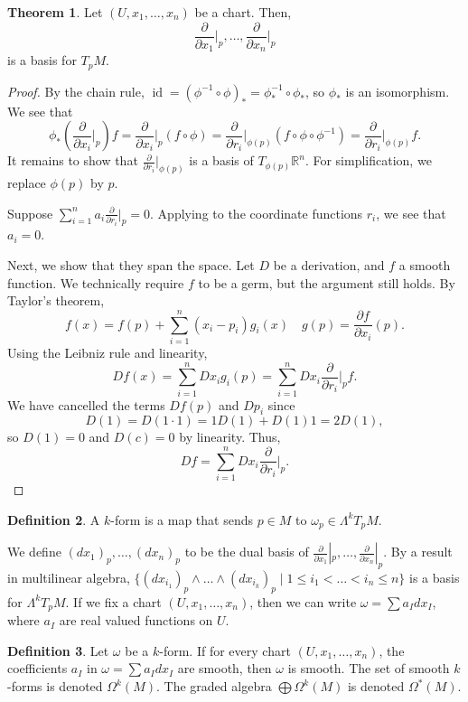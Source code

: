 \documentclass[]{article}
\DeclareMathOperator{\id}{id}
\theoremstyle{definition}
\newtheorem{theorem}{Theorem}[section] %
\theoremstyle{definition}
\newtheorem{definition}[theorem]{Definition} %
\begin{document}
\begin{theorem}
    Let $(U, x_1, \dots, x_n)$ be a chart. Then, \[\frac{\partial}{\partial x_1}\bigg|_p, \dots, \frac{\partial}{\partial x_n}\bigg|_p\] is a basis for $T_pM$.
\end{theorem}
\begin{proof}
    By the chain rule, $\id=(\phi^{-1}\circ\phi)_*=\phi^{-1}_*\circ \phi_*$, so $\phi_*$ is an isomorphism. We see that \[\phi_*\left(\frac{\partial}{\partial x_i}\bigg|_p\right)f=\frac{\partial}{\partial x_i}\bigg|_p(f\circ\phi)=\frac{\partial}{\partial r_i}\bigg|_{\phi(p)}(f\circ\phi\circ\phi^{-1})=\frac{\partial}{\partial r_i}|_{\phi(p)}f.\] It remains to show that $\frac{\partial}{\partial r_i}|_{\phi(p)}$ is a basis of $T_{\phi(p)}\mathbb{R}^n$. For simplification, we replace $\phi(p)$ by $p$.

    Suppose $\sum_{i=1}^{n}a_i\frac{\partial}{\partial r_i}|_{p}=0$. Applying to the coordinate functions $r_i$, we see that $a_i=0$.

    Next, we show that they span the space. Let $D$ be a derivation, and $f$ a smooth function. We technically require $f$ to be a germ, but the argument still holds. By Taylor's theorem, \[f(x)=f(p)+\sum_{i=1}^{n}(x_i-p_i)g_i(x)\quad g(p)=\frac{\partial f}{\partial x_i}(p).\] Using the Leibniz rule and linearity, \[Df(x)=\sum_{i=1}^{n}Dx_ig_i(p)=\sum_{i=1}^{n}Dx_i\frac{\partial}{\partial r_i}\bigg|_{p}f.\] We have cancelled the terms $Df(p)$ and $Dp_i$ since \[D(1)=D(1\cdot 1)=1D(1)+D(1)1=2D(1),\] so $D(1)=0$ and $D(c)=0$ by linearity. Thus, \[Df=\sum_{i=1}^{n}Dx_i\frac{\partial}{\partial r_i}\bigg|_{p}.\]
\end{proof}

\begin{definition}
    A $k$-form is a map that sends $p\in M$ to $\omega_p\in \Lambda^kT_pM$.
\end{definition}

We define $(dx_1)_p, \dots, (dx_n)_p$ to be the dual basis of $\frac{\partial}{\partial x_1}|_p, \dots, \frac{\partial}{\partial x_n}|_p$. By a result in multilinear algebra, $\{(dx_{i_1})_p\wedge\dots\wedge(dx_{i_k})_p\mid 1\leq i_1<\dots<i_n\leq n\}$ is a basis for $\Lambda^kT_pM$. If we fix a chart $(U, x_1, \dots, x_n)$, then we can write $\omega=\sum a_Idx_I$, where $a_I$ are real valued functions on $U$.

\begin{definition}
Let $\omega$ be a $k$-form. If for every chart $(U, x_1, \dots, x_n)$, the coefficients $a_I$ in $\omega=\sum a_Idx_I$ are smooth, then $\omega$ is smooth. The set of smooth $k$-forms is denoted $\Omega^k(M)$. The graded algebra $\bigoplus \Omega^k(M)$ is denoted $\Omega^*(M)$.
\end{definition}
\end{document}
